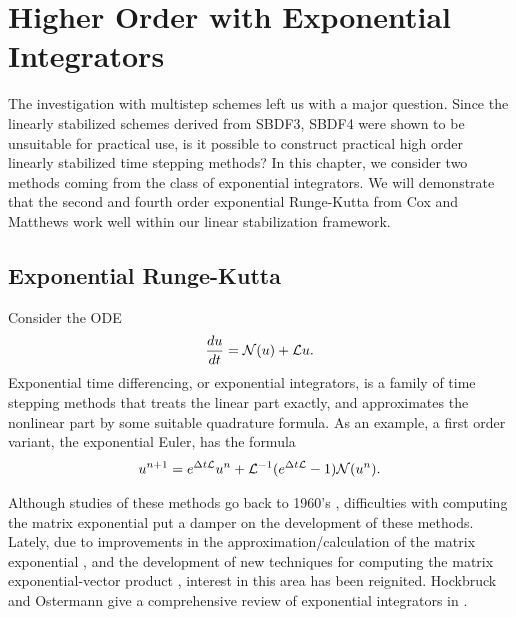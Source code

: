 \chapter{Higher Order with Exponential Integrators}
The investigation with multistep schemes left us with a major question. Since the linearly stabilized schemes derived from SBDF3, SBDF4 were shown to be unsuitable for practical use, is it possible to construct practical high order linearly stabilized time stepping methods? In this chapter, we consider two methods coming from the class of exponential integrators. We will demonstrate that the second and fourth order exponential Runge-Kutta from Cox and Matthews \cite{cox2002exponential} work well within our linear stabilization framework.

\section{Exponential Runge-Kutta}
Consider the ODE
\begin{align}
\frac{du}{dt} = \mathcal{N}(u) + \mathcal{L} u.
\end{align}
Exponential time differencing, or exponential integrators, is a family of time stepping methods that treats the linear part exactly, and approximates the nonlinear part by some suitable quadrature formula. As an example, a first order variant, the exponential Euler, has the formula
\begin{align}
u^{n+1} 
= e^{\Delta t\mathcal{L}} u^n + \mathcal{L}^{-1}(e^{\Delta t\mathcal{L}}  -1) \mathcal{N}(u^n).
\end{align}

Although studies of these methods go back to 1960's \cite{}, difficulties with computing the matrix exponential put a damper on the development of these methods. Lately, due to improvements in the approximation/calculation of the matrix exponential \cite{}, and the development of new techniques for computing the matrix exponential-vector product \cite{}, interest in this area has been reignited. Hockbruck and Ostermann give a comprehensive review of exponential integrators in \cite{hochbruck2010expintegrators}.

